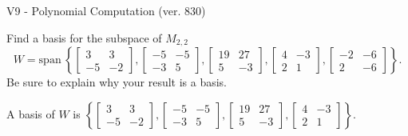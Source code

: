 \begin{exercise}
  \begin{exerciseTitle}V9 - Polynomial Computation (ver. 830)\end{exerciseTitle}
  \begin{exerciseStatement}
    Find a basis for the subspace of \(M_{2,2}\) 
\[W=\mathrm{span}\ \left\{\left[\begin{array}{cc}
3 & 3 \\
-5 & -2
\end{array}\right] , \left[\begin{array}{cc}
-5 & -5 \\
-3 & 5
\end{array}\right] , \left[\begin{array}{cc}
19 & 27 \\
5 & -3
\end{array}\right] , \left[\begin{array}{cc}
4 & -3 \\
2 & 1
\end{array}\right] , \left[\begin{array}{cc}
-2 & -6 \\
2 & -6
\end{array}\right]\right\}.\]
 Be sure to explain why your result is a basis.


  \end{exerciseStatement}
  \begin{exerciseAnswer}
   A basis of \(W\) is  \(\left\{\left[\begin{array}{cc}
3 & 3 \\
-5 & -2
\end{array}\right] , \left[\begin{array}{cc}
-5 & -5 \\
-3 & 5
\end{array}\right] , \left[\begin{array}{cc}
19 & 27 \\
5 & -3
\end{array}\right] , \left[\begin{array}{cc}
4 & -3 \\
2 & 1
\end{array}\right]\right\}\).
  


  \end{exerciseAnswer}
\end{exercise}